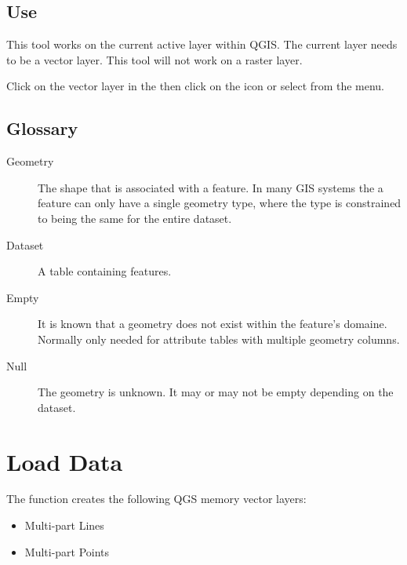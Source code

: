 \documentclass[letterpaper,10pt,english]{sphinxmanual}
\begin{document}
\section{Use}
\label{\detokenize{geomAttribute:use}}
This tool works on the current active layer within QGIS.  The current layer needs to be a vector layer.  This tool will
not work on a raster layer.

Click on the vector layer in the  then click on the  icon  or select
 from the  menu.


\section{Glossary}
\label{\detokenize{geomAttribute:glossary}}\begin{description}
\item[{Geometry}] \leavevmode
The shape that is associated with a feature.  In many GIS systems the a feature can only have a single geometry type,
where the type is constrained to being the same for the entire dataset.

\item[{Dataset}] \leavevmode
A table containing features.

\item[{Empty}] \leavevmode
It is known that a geometry does not exist within the feature’s domaine.  Normally only needed for attribute tables
with multiple geometry columns.

\item[{Null}] \leavevmode
The geometry is unknown.  It may or may not be empty depending on the dataset.

\end{description}


\chapter{Load Data}
\label{\detokenize{loadData:load-data}}\label{\detokenize{loadData::doc}}
The   function creates the following QGS memory vector layers:
\begin{itemize}
\item {} 
Multi-part Lines

\item {} 
Multi-part Points

\end{itemize}
\end{document}
